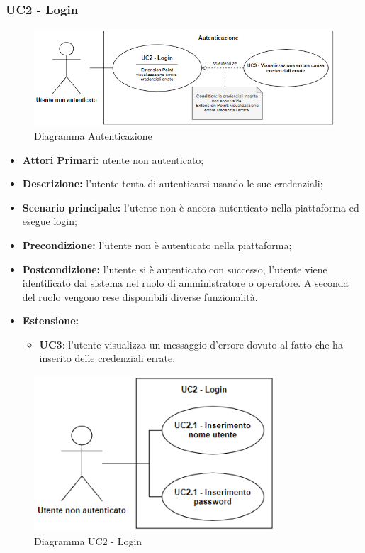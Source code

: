 \subsubsection{UC2 - Login}

\begin{figure}[h!]
	\centering
	\includegraphics[width=15cm]{images/autenticazione.png}
	\caption{Diagramma Autenticazione}
\end{figure}

\begin{itemize}
	\item \textbf{Attori Primari:} utente non autenticato;
	\item \textbf{Descrizione:} l'utente tenta di autenticarsi usando le sue credenziali;
	\item \textbf{Scenario principale:} l'utente non è ancora autenticato nella piattaforma ed esegue login;
	\item \textbf{Precondizione:} l'utente non è autenticato nella piattaforma;
	\item \textbf{Postcondizione:} l'utente si è autenticato con successo, l'utente viene identificato dal sistema nel ruolo di amministratore o operatore. A seconda del ruolo vengono rese disponibili diverse funzionalità.
	\item \textbf{Estensione:}
		\begin{itemize}
			\item \textbf{UC3}: l'utente visualizza un messaggio d'errore dovuto al fatto che ha inserito delle credenziali errate.
		\end{itemize}
\end{itemize}

\begin{figure}[h!]
	\centering
	\includegraphics[width=9cm]{images/uc2.png}
	\caption{Diagramma UC2 - Login}
\end{figure}

